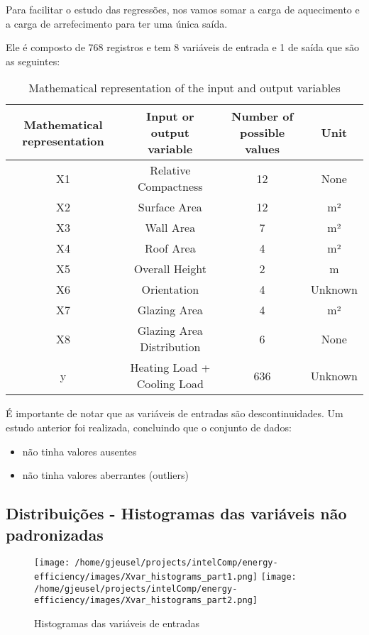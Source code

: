\documentclass[paper=a4, fontsize=11pt]{article} %
\numberwithin{equation}{section} %
\numberwithin{figure}{section} %
\numberwithin{table}{section} %
\begin{document}
Para facilitar o estudo das regressões, nos vamos somar a carga de aquecimento e a carga de arrefecimento para ter uma única saída.

\medskip
Ele é composto de 768 registros e tem 8 variáveis de entrada e 1 de saída que são as seguintes:

\begin{table}[H]
\caption{Mathematical representation of the input and output variables}
\medskip
\renewcommand\arraystretch{1.3}
\renewcommand\tabcolsep{0pt}
  \begin{tabular*}{1\linewidth}{@{\extracolsep{\fill}}cccc}
    \hline
    Mathematical representation & Input or output variable & Number of possible values & Unit \\
    \hline
    X1 & Relative Compactness & 12 & None \\
    X2 & Surface Area & 12 & m²\\
    X3 & Wall Area & 7 & m²\\
    X4 & Roof Area & 4 & m²\\
    X5 & Overall Height & 2 & m\\
    X6 & Orientation & 4 & Unknown\\
    X7 & Glazing Area & 4 & m²\\
    X8 & Glazing Area Distribution & 6 & None \\
    y & Heating Load + Cooling Load & 636 & Unknown \\
  \end{tabular*}\par\medskip
\label{tab:priors}
\end{table}

É importante de notar que as variáveis de entradas são descontinuidades.\newline
Um estudo anterior foi realizada, concluindo que o conjunto de dados:
\begin{itemize}
\item não tinha valores ausentes
\item não tinha valores aberrantes (outliers)
\end{itemize}


\subsection{Distribuições - Histogramas das variáveis não padronizadas}

  \begin{figure}[H] %
  \begin{center}
  \texttt{[image: /home/gjeusel/projects/intelComp/energy-efficiency/images/Xvar\_histograms\_part1.png]}
  \texttt{[image: /home/gjeusel/projects/intelComp/energy-efficiency/images/Xvar\_histograms\_part2.png]}
  \end{center}
  \caption{Histogramas das variáveis de entradas}
  \label{hist_X}
  \end{figure}
\end{document}
